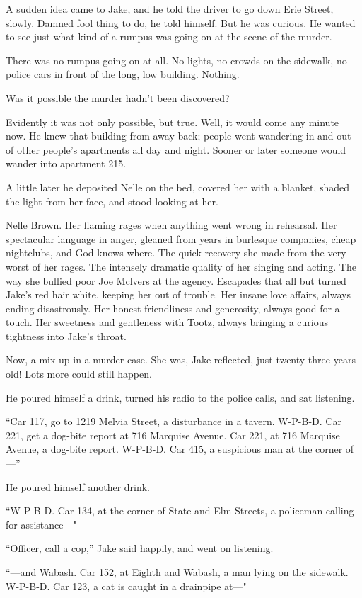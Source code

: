 \documentclass{novel}
\begin{document}
A sudden idea came to Jake, and he told the driver to go down Erie Street, slowly. Damned fool thing to do, he told himself. But he was curious. He wanted to see just what kind of a rumpus was going on at the scene of the murder.

There was no rumpus going on at all. No lights, no crowds on the sidewalk, no police cars in front of the long, low building. Nothing.

Was it possible the murder hadn’t been discovered?

Evidently it was not only possible, but true. Well, it would come any minute now. He knew that building from away back; people went wandering in and out of other people’s apartments all day and night. Sooner or later someone would wander into apartment 215.

A little later he deposited Nelle on the bed, covered her with a blanket, shaded the light from her face, and stood looking at her.

Nelle Brown. Her flaming rages when anything went wrong in rehearsal. Her spectacular language in anger, gleaned from years in burlesque companies, cheap nightclubs, and God knows where. The quick recovery she made from the very worst of her rages. The intensely dramatic quality of her singing and acting. The way she bullied poor Joe Mclvers at the agency. Escapades that all but turned Jake’s red hair white, keeping her out of trouble. Her insane love affairs, always ending disastrously. Her honest friendliness and generosity, always good for a touch. Her sweetness and gentleness with Tootz, always bringing a curious tightness into Jake’s throat.

Now, a mix-up in a murder case. She was, Jake reflected, just twenty-three years old! Lots more could still happen.

He poured himself a drink, turned his radio to the police calls, and sat listening.

“Car 117, go to 1219 Melvia Street, a disturbance in a tavern. W-P-B-D. Car 221, get a dog-bite report at 716 Marquise Avenue. Car 221, at 716 Marquise Avenue, a dog-bite report. W-P-B-D. Car 415, a suspicious man at the corner of—”

He poured himself another drink.

“W-P-B-D. Car 134, at the corner of State and Elm Streets, a policeman calling for assistance—"

“Officer, call a cop,” Jake said happily, and went on listening.

“—and Wabash. Car 152, at Eighth and Wabash, a man lying on the sidewalk. W-P-B-D. Car 123, a cat is caught in a drainpipe at—"
\end{document}
